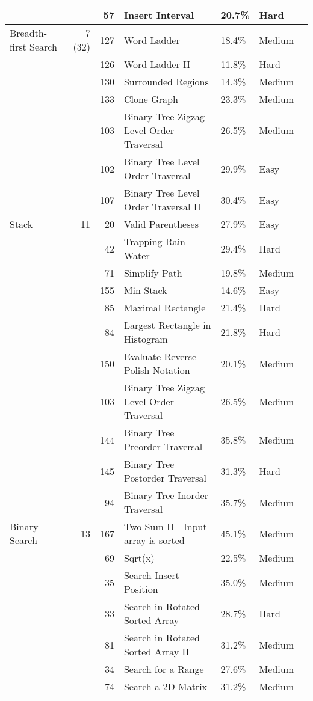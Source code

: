 \documentclass[9pt,b5paper]{article}
\begin{document}
\begin{center}
\begin{tabular}{lrrllll}
 &  & 57 & Insert Interval & 20.7\% & Hard & \\
\hline
Breadth-first Search & 7 (32) & 127 & Word Ladder & 18.4\% & Medium & \\
 &  & 126 & Word Ladder II & 11.8\% & Hard & \\
 &  & 130 & Surrounded Regions & 14.3\% & Medium & \\
 &  & 133 & Clone Graph & 23.3\% & Medium & \\
 &  & 103 & Binary Tree Zigzag Level Order Traversal & 26.5\% & Medium & \\
 &  & 102 & Binary Tree Level Order Traversal & 29.9\% & Easy & \\
 &  & 107 & Binary Tree Level Order Traversal II & 30.4\% & Easy & \\
\hline
Stack & 11 & 20 & Valid Parentheses & 27.9\% & Easy & \\
 &  & 42 & Trapping Rain Water & 29.4\% & Hard & \\
 &  & 71 & Simplify Path & 19.8\% & Medium & \\
 &  & 155 & Min Stack & 14.6\% & Easy & \\
 &  & 85 & Maximal Rectangle & 21.4\% & Hard & \\
 &  & 84 & Largest Rectangle in Histogram & 21.8\% & Hard & \\
 &  & 150 & Evaluate Reverse Polish Notation & 20.1\% & Medium & \\
 &  & 103 & Binary Tree Zigzag Level Order Traversal & 26.5\% & Medium & \\
 &  & 144 & Binary Tree Preorder Traversal & 35.8\% & Medium & \\
 &  & 145 & Binary Tree Postorder Traversal & 31.3\% & Hard & \\
 &  & 94 & Binary Tree Inorder Traversal & 35.7\% & Medium & \\
\hline
Binary Search & 13 & 167 & Two Sum II - Input array is sorted & 45.1\% & Medium & \\
 &  & 69 & Sqrt(x) & 22.5\% & Medium & \\
 &  & 35 & Search Insert Position & 35.0\% & Medium & \\
 &  & 33 & Search in Rotated Sorted Array & 28.7\% & Hard & \\
 &  & 81 & Search in Rotated Sorted Array II & 31.2\% & Medium & \\
 &  & 34 & Search for a Range & 27.6\% & Medium & \\
 &  & 74 & Search a 2D Matrix & 31.2\% & Medium & \\

\end{tabular}
\end{center}
\end{document}
